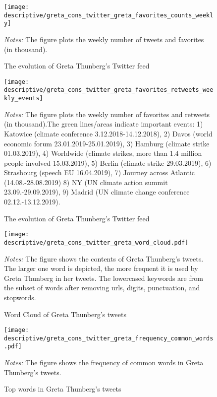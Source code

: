 \documentclass[11pt, a4paper]{article} %
\begin{document}
\begin{figure}[H]\centering
	\caption{The evolution of Greta Thunberg's Twitter feed}
	\texttt{[image: descriptive/greta\_cons\_twitter\_greta\_favorites\_counts\_weekly]}
	\begin{minipage}{\linewidth}
		\scriptsize{\emph{Notes:} The figure plots the weekly number of tweets and favorites (in thousand).}
	\end{minipage}
\end{figure}

\begin{figure}[H]\centering
	\caption{The evolution of Greta Thunberg's Twitter feed}
	\texttt{[image: descriptive/greta\_cons\_twitter\_greta\_favorites\_retweets\_weekly\_events]}
	\begin{minipage}{\linewidth}
		\scriptsize{\emph{Notes:} The figure plots the weekly number of favorites and retweets (in thousand).The green lines/areas indicate important events: 1) Katowice (climate conference 3.12.2018-14.12.2018), 2) Davos (world economic forum 23.01.2019-25.01.2019), 3) Hamburg (climate strike 01.03.2019), 4) Worldwide (climate strikes, more than 1.4 million people involved 15.03.2019), 5) Berlin (climate strike 29.03.2019), 6) Strasbourg (speech EU 16.04.2019), 7) Journey across Atlantic (14.08.-28.08.2019) 8) NY (UN climate action summit 23.09.-29.09.2019), 9) Madrid (UN climate change conference 02.12.-13.12.2019).}
	\end{minipage}
\end{figure}



\newpage
\begin{figure}[H]\centering
	\caption{Word Cloud of Greta Thunberg's tweets}
	\texttt{[image: descriptive/greta\_cons\_twitter\_greta\_word\_cloud.pdf]}
	\begin{minipage}{\linewidth}
		\scriptsize{\emph{Notes:} The figure shows the contents of Greta Thunberg's tweets. The larger one word is depicted, the more frequent it is used by Greta Thunberg in her tweets. The lowercased keywords are from the subset of words after removing urls, digits, punctuation, and stopwords.}
	\end{minipage}
\end{figure}

\begin{figure}[H]\centering
	\caption{Top words in Greta Thunberg's tweets}
	\texttt{[image: descriptive/greta\_cons\_twitter\_greta\_frequency\_common\_words.pdf]}
	\begin{minipage}{\linewidth}
		\scriptsize{\emph{Notes:} The figure shows the frequency of common words in Greta Thunberg's tweets.}
	\end{minipage}
\end{figure}
\end{document}
